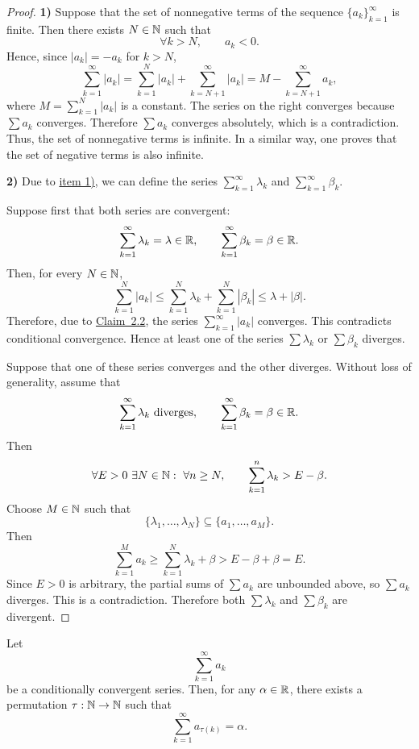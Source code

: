 \begin{proof}
\textbf{1)} Suppose that the set of nonnegative terms of the sequence $\{a_k\}_{k=1}^{\infty}$ is finite. Then there exists $N\in\mathbb{N}$ such that
\[
\forall k>N,
\qquad a_k<0.
\]
Hence, since $|a_k|=-a_k$ for $k>N$,
\[
\sum_{k=1}^{\infty}|a_k|
=\sum_{k=1}^{N}|a_k|+\sum_{k=N+1}^{\infty}|a_k|
=M-\sum_{k=N+1}^{\infty}a_k,
\]
where $M=\sum_{k=1}^{N}|a_k|$ is a constant. The series on the right converges because $\sum a_k$ converges. Therefore $\sum a_k$ converges absolutely, which is a contradiction. Thus, the set of nonnegative terms is infinite. In a similar way, one proves that the set of negative terms is also infinite.

\medskip
\noindent\textbf{2)} Due to \hyperref[item:claim:3.10:1]{item 1)}, we can define the series $\sum_{k=1}^{\infty}\lambda_k$ and $\sum_{k=1}^{\infty}\beta_k$.

Suppose first that both series are convergent:
\[
\sum_{k=1}^{\infty}\lambda_k=\lambda\in\mathbb{R},
\qquad
\sum_{k=1}^{\infty}\beta_k=\beta\in\mathbb{R}.
\]
Then, for every $N\in\mathbb{N}$,
\[
\sum_{k=1}^{N}|a_k|
\le
\sum_{k=1}^{N}\lambda_k
+\sum_{k=1}^{N}|\beta_k|
\le\lambda+|\beta|.
\]
Therefore, due to \hyperref[claim:2.2]{Claim~2.2}, the series $\sum_{k=1}^{\infty}|a_k|$ converges. This contradicts conditional convergence. Hence at least one of the series $\sum\lambda_k$ or $\sum\beta_k$ diverges.

Suppose that one of these series converges and the other diverges. Without loss of generality, assume that
\[
\sum_{k=1}^{\infty}\lambda_k\text{ diverges},
\qquad
\sum_{k=1}^{\infty}\beta_k=\beta\in\mathbb{R}.
\]
Then
\[
\forall E>0\ \exists N\in\mathbb{N}:\ \forall n\ge N,
\qquad
\sum_{k=1}^{n}\lambda_k>E-\beta.
\]
Choose $M\in\mathbb{N}$ such that
\[
\{\lambda_1,\ldots,\lambda_N\}\subseteq\{a_1,\ldots,a_M\}.
\]
Then
\[
\sum_{k=1}^{M}a_k
\ge\sum_{k=1}^{N}\lambda_k+\beta
>E-\beta+\beta=E.
\]
Since $E>0$ is arbitrary, the partial sums of $\sum a_k$ are unbounded above, so $\sum a_k$ diverges. This is a contradiction. Therefore both $\sum\lambda_k$ and $\sum\beta_k$ are divergent.
\end{proof}

\begin{claim}\label{claim:3.11}
Let
\[
\sum_{k=1}^{\infty}a_k
\]
be a conditionally convergent series. Then, for any $\alpha\in\mathbb{R}$, there exists a permutation $\tau:\mathbb{N}\to\mathbb{N}$ such that
\[
\sum_{k=1}^{\infty}a_{\tau(k)}=\alpha.
\]
\end{claim}

